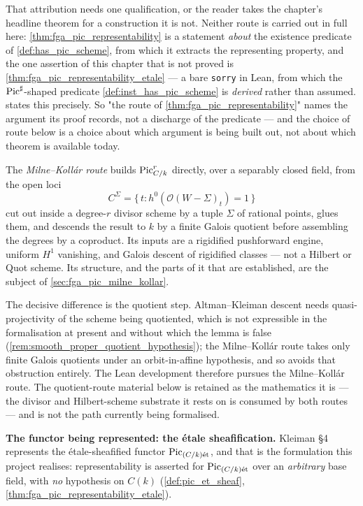 That attribution needs one qualification, or the reader takes the chapter's headline
theorem for a construction it is not. Neither route is carried out in full here:
\cref{thm:fga_pic_representability} is a statement \emph{about} the existence predicate
of \cref{def:has_pic_scheme}, from which it extracts the representing property, and the
one assertion of this chapter that is not proved is
\cref{thm:fga_pic_representability_etale} --- a bare \texttt{sorry} in Lean, from which
the \(\operatorname{Pic}^\sharp\)-shaped predicate \cref{def:inst_has_pic_scheme} is
\emph{derived} rather than assumed.  states this
precisely.
So "the route of \cref{thm:fga_pic_representability}" names the argument its proof
records, not a discharge of the predicate --- and the choice of route below is a choice
about which argument is being built out, not about which theorem is available today.

The \emph{Milne--Koll\'ar route} builds \(\operatorname{Pic}^r_{C/k}\) directly, over a
separably closed field, from the open loci
\[
  C^\Sigma = \{\,t : h^0(\mathcal{O}(W - \Sigma)_t) = 1\,\}
\]
cut out inside a degree-\(r\) divisor scheme by a tuple \(\Sigma\) of rational
points, glues them, and descends the result to \(k\) by a finite Galois quotient
before assembling the degrees by a coproduct. Its inputs are a rigidified
pushforward engine, uniform \(H^1\) vanishing, and Galois descent of rigidified
classes --- not a Hilbert or Quot scheme. Its structure, and the parts of it that
are established, are the subject of \cref{sec:fga_pic_milne_kollar}.

The decisive difference is the quotient step. Altman--Kleiman descent needs
quasi-projectivity of the scheme being quotiented, which is not expressible in
the formalisation at present and without which the lemma is false
(\cref{rem:smooth_proper_quotient_hypothesis}); the Milne--Koll\'ar route takes
only finite Galois quotients under an orbit-in-affine hypothesis, and so avoids
that obstruction entirely. The Lean development therefore pursues the
Milne--Koll\'ar route. The quotient-route material below is retained as the
mathematics it is --- the divisor and Hilbert-scheme substrate it rests on is
consumed by both routes --- and is not the path currently being formalised.

\medskip

\textbf{The functor being represented: the \'etale sheafification.} Kleiman \S 4
represents the \'etale-sheafified functor \(\operatorname{Pic}_{(C/k)\mathrm{\acute{e}t}}\), and that is the
formulation this project realises: representability is asserted for
\(\operatorname{Pic}_{(C/k)\mathrm{\acute{e}t}}\) over an \emph{arbitrary} base field, with \emph{no}
hypothesis on \(C(k)\) (\cref{def:pic_et_sheaf},
\cref{thm:fga_pic_representability_etale}).

